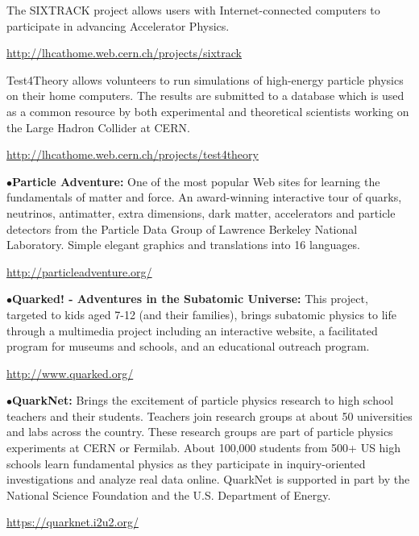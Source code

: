 \item{}The SIXTRACK project allows users with Internet-connected computers to participate in advancing Accelerator Physics.
	\item{}\qquad\url{http://lhcathome.web.cern.ch/projects/sixtrack}

\smallskip

\item{}Test4Theory allows volunteers to run simulations of high-energy particle physics on their home computers. The results are submitted to a database which is used as a common resource by both experimental and theoretical scientists working on the Large Hadron Collider at CERN.
	\item{}\qquad\url{http://lhcathome.web.cern.ch/projects/test4theory}

\smallskip

\item{$\bullet$}{\bf Particle Adventure:}
One of the most popular Web sites for learning the fundamentals of matter and force. An award-winning interactive tour of quarks, neutrinos, antimatter, extra dimensions, dark matter, accelerators and particle detectors from the Particle Data Group of Lawrence Berkeley National Laboratory. Simple elegant graphics and translations into 16 languages.
	\item{}\qquad\url{http://particleadventure.org/}

\smallskip

\item{$\bullet$}{\bf Quarked! - Adventures in the Subatomic Universe:}
This project, targeted to kids aged 7-12 (and their families), brings subatomic physics to life through a multimedia project including an interactive website, a facilitated program for museums and schools, and an educational outreach program.
	\item{}\qquad\url{http://www.quarked.org/}

\smallskip

\item{$\bullet$}{\bf QuarkNet:}
Brings the excitement of particle physics research to high school teachers and their students. Teachers join research groups at about 50 universities and labs across the country. These research groups are part of particle physics experiments at CERN or Fermilab. About 100,000 students from 500+ US high schools learn fundamental physics as they participate in inquiry-oriented investigations and analyze real data online. QuarkNet is supported in part by the National Science Foundation and the U.S. Department of Energy.
	\item{}\qquad\url{https://quarknet.i2u2.org/}

